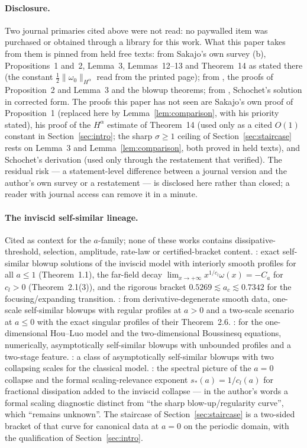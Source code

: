 \documentclass[11pt,a4paper]{article}
\theoremstyle{plain}
\theoremstyle{definition}
\newcommand{\nrm}[1]{\lVert #1 \rVert}
\begin{document}
\paragraph{Disclosure.} Two journal primaries cited above were not read: no paywalled item was purchased or obtained through a library for this work. What this paper takes from them is pinned from held free texts: from Sakajo's own survey (b), Propositions~1 and~2, Lemma~3, Lemmas~12--13 and Theorem~14 as stated there (the constant $\tfrac12\nrm{\omega_0}_{H^\alpha}$ read from the printed page); from \cite{Sak03b}, the proofs of Proposition~2 and Lemma~3 and the blowup theorems; from \cite[\S5.1]{ALSS24}, Schochet's solution in corrected form. The proofs this paper has not seen are Sakajo's own proof of Proposition~1 (replaced here by Lemma~\ref{lem:comparison}, with his priority stated), his proof of the $H^\alpha$ estimate of Theorem~14 (used only as a cited $O(1)$ constant in Section~\ref{sec:intro}; the sharp $\sigma\ge1$ ceiling of Section~\ref{sec:staircase} rests on Lemma~3 and Lemma~\ref{lem:comparison}, both proved in held texts), and Schochet's derivation (used only through the restatement that \cite{ALSS24} verified). The residual risk --- a statement-level difference between a journal version and the author's own survey or a restatement --- is disclosed here rather than closed; a reader with journal access can remove it in a minute.

\paragraph{The inviscid self-similar lineage.} Cited as context for the $a$-family; none of these works contains dissipative-threshold, selection, amplitude, rate-law or certified-bracket content. \cite{HQWW24}: exact self-similar blowup solutions of the inviscid model with interiorly smooth profiles for all $a\le1$ (Theorem~1.1), the far-field decay $\lim_{x\to+\infty}x^{1/c_l}\omega(x)=-C_a$ for $c_l>0$ (Theorem~2.1(3)), and the rigorous bracket $0.5269\lesssim a_c\lesssim0.7342$ for the focusing/expanding transition. \cite{HTW26}: from derivative-degenerate smooth data, one-scale self-similar blowups with regular profiles at $a>0$ and a two-scale scenario at $a\le0$ with the exact singular profiles of their Theorem~2.6. \cite{CHL26}: for the one-dimensional Hou--Luo model and the two-dimensional Boussinesq equations, numerically, asymptotically self-similar blowups with unbounded profiles and a two-stage feature. \cite{HQW25}: a class of asymptotically self-similar blowups with two collapsing scales for the classical model. \cite{Xu26}: the spectral picture of the $a=0$ collapse and the formal scaling-relevance exponent $s_*(a)=1/c_l(a)$ for fractional dissipation added to the inviscid collapse --- in the author's words a formal scaling diagnostic distinct from ``the sharp blow-up/regularity curve'', which ``remains unknown''. The staircase of Section~\ref{sec:staircase} is a two-sided bracket of that curve for canonical data at $a=0$ on the periodic domain, with the qualification of Section~\ref{sec:intro}.
\end{document}
